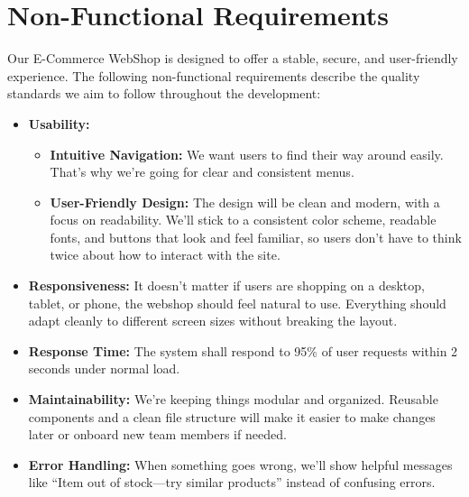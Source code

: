 \documentclass[a4paper,12pt]{article}
\begin{document}
	\section{Non-Functional Requirements}




Our E-Commerce WebShop is designed to offer a stable, secure, and user-friendly experience. The following non-functional requirements describe the quality standards we aim to follow throughout the development:




\begin{itemize}
    \item \textbf{Usability:}
    \begin{itemize}
        \item \textbf{Intuitive Navigation:}
        We want users to find their way around easily. That’s why we’re going for clear and consistent menus.




        \item \textbf{User-Friendly Design:}
        The design will be clean and modern, with a focus on readability. We’ll stick to a consistent color scheme, readable fonts, and buttons that look and feel familiar, so users don’t have to think twice about how to interact with the site.
    \end{itemize}




    \item \textbf{Responsiveness:}
    It doesn't matter if users are shopping on a desktop, tablet, or phone, the webshop should feel natural to use. Everything should adapt cleanly to different screen sizes without breaking the layout.




    \item \textbf{Response Time:}
    The system shall respond to 95\% of user requests within 2 seconds under normal load.




    \item \textbf{Maintainability:}
    We’re keeping things modular and organized. Reusable components and a clean file structure will make it easier to make changes later or onboard new team members if needed.




    \item \textbf{Error Handling:}
        When something goes wrong, we'll show helpful messages like “Item out of stock—try similar products” instead of confusing errors.
\end{itemize}
\end{document}

